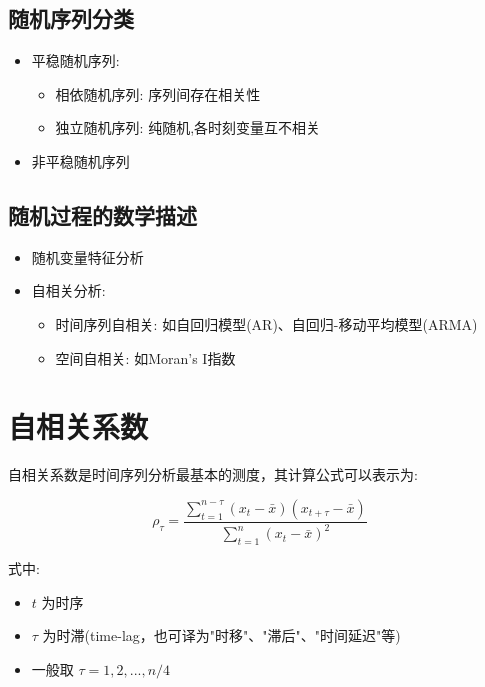 \subsection{随机序列分类}
\begin{itemize}
    \item 平稳随机序列:
        \begin{itemize}
            \item 相依随机序列: 序列间存在相关性
            \item 独立随机序列: 纯随机,各时刻变量互不相关
        \end{itemize}
    \item 非平稳随机序列
\end{itemize}

\subsection{随机过程的数学描述}
\begin{itemize}
    \item 随机变量特征分析
    \item 自相关分析:
        \begin{itemize}
            \item 时间序列自相关: 如自回归模型(AR)、自回归-移动平均模型(ARMA)
            \item 空间自相关: 如Moran's I指数
        \end{itemize}
\end{itemize}




\section{自相关系数}

自相关系数是时间序列分析最基本的测度，其计算公式可以表示为:

\begin{equation}
\rho_\tau = \frac{\sum_{t=1}^{n-\tau}(x_t - \bar{x})(x_{t+\tau} - \bar{x})}{\sum_{t=1}^{n}(x_t - \bar{x})^2}
\end{equation}

式中:
\begin{itemize}
    \item $t$ 为时序
    \item $\tau$ 为时滞(time-lag，也可译为"时移"、"滞后"、"时间延迟"等)
    \item 一般取 $\tau = 1, 2, ..., n/4$
\end{itemize}


